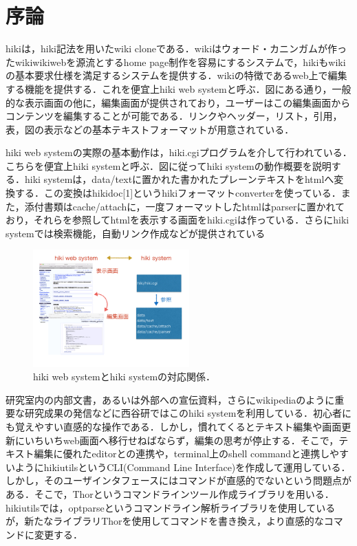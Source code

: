 \section{序論}
hikiは，hiki記法を用いたwiki cloneである．wikiはウォード・カニンガムが作ったwikiwikiwebを源流とするhome page制作を容易にするシステムで，hikiもwikiの基本要求仕様を満足するシステムを提供する．wikiの特徴であるweb上で編集する機能を提供する．これを便宜上hiki web systemと呼ぶ．図にある通り，一般的な表示画面の他に，編集画面が提供されており，ユーザーはこの編集画面からコンテンツを編集することが可能である．リンクやヘッダー，リスト，引用，表，図の表示などの基本テキストフォーマットが用意されている．

hiki web systemの実際の基本動作は，hiki.cgiプログラムを介して行われている．こちらを便宜上hiki systemと呼ぶ．図に従ってhiki systemの動作概要を説明する．hiki systemは，data/textに置かれた書かれたプレーンテキストをhtmlへ変換する．この変換はhikidoc[1]というhikiフォーマットconverterを使っている．また，添付書類はcache/attachに，一度フォーマットしたhtmlはparserに置かれており，それらを参照してhtmlを表示する画面をhiki.cgiは作っている．さらにhiki systemでは検索機能，自動リンク作成などが提供されている

\begin{figure}[htbp]\begin{center}
\includegraphics[width=6cm,bb=0 0 442 432]{../figs/./hikiutils_yamane.001.jpg}
\caption{hiki web systemとhiki systemの対応関係．}
\label{default}\end{center}\end{figure}
研究室内の内部文書，あるいは外部への宣伝資料，さらにwikipediaのように重要な研究成果の発信などに西谷研ではこのhiki systemを利用している．初心者にも覚えやすい直感的な操作である．しかし，慣れてくるとテキスト編集や画面更新にいちいちweb画面へ移行せねばならず，編集の思考が停止する．そこで，テキスト編集に優れたeditorとの連携や，terminal上のshell commandと連携しやすいようにhikiutilsというCLI(Command Line Interface)を作成して運用している．しかし，そのユーザインタフェースにはコマンドが直感的でないという問題点がある．そこで，Thorというコマンドラインツール作成ライブラリを用いる．hikiutilsでは，optparseというコマンドライン解析ライブラリを使用しているが，新たなライブラリThorを使用してコマンドを書き換え，より直感的なコマンドに変更する．


